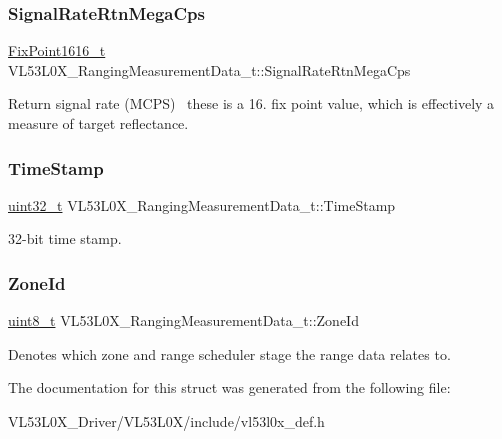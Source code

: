 \subsubsection{\texorpdfstring{Signal\+Rate\+Rtn\+Mega\+Cps}{SignalRateRtnMegaCps}}
{\footnotesize\ttfamily \hyperlink{vl53l0x__types_8h_afb910790161809fc76e1a274a6349384}{Fix\+Point1616\+\_\+t} V\+L53\+L0\+X\+\_\+\+Ranging\+Measurement\+Data\+\_\+t\+::\+Signal\+Rate\+Rtn\+Mega\+Cps}

Return signal rate (M\+C\+PS)~\newline
 these is a 16. fix point value, which is effectively a measure of target reflectance. \mbox{\label{structVL53L0X__RangingMeasurementData__t_a3cf44225f58ed787e06210d7d6ba2b85}} 
\subsubsection{\texorpdfstring{Time\+Stamp}{TimeStamp}}
{\footnotesize\ttfamily \hyperlink{vl53l0x__types_8h_a435d1572bf3f880d55459d9805097f62}{uint32\+\_\+t} V\+L53\+L0\+X\+\_\+\+Ranging\+Measurement\+Data\+\_\+t\+::\+Time\+Stamp}

32-\/bit time stamp. \mbox{\label{structVL53L0X__RangingMeasurementData__t_a5819f92d725a3dfba7c0897f69ce3fca}} 
\subsubsection{\texorpdfstring{Zone\+Id}{ZoneId}}
{\footnotesize\ttfamily \hyperlink{vl53l0x__types_8h_aba7bc1797add20fe3efdf37ced1182c5}{uint8\+\_\+t} V\+L53\+L0\+X\+\_\+\+Ranging\+Measurement\+Data\+\_\+t\+::\+Zone\+Id}

Denotes which zone and range scheduler stage the range data relates to. 

The documentation for this struct was generated from the following file\+:\begin{DoxyCompactItemize}
\item 
V\+L53\+L0\+X\+\_\+\+Driver/\+V\+L53\+L0\+X/include/vl53l0x\+\_\+def.\+h\end{DoxyCompactItemize}
